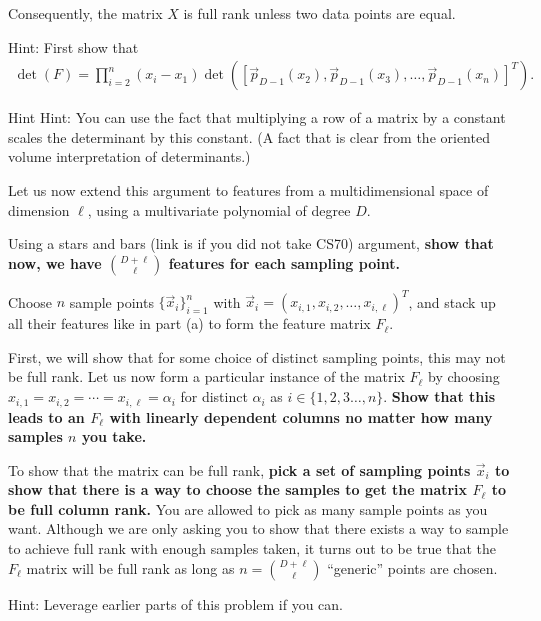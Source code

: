 \begin{Parts}
 Consequently, the matrix $X$ is full rank unless two data points are equal.

Hint: First show that
\begin{align*}
\det(F) = \prod_{i = 2}^n (x_i - x_1) \det( [\vec{p}_{D-1}(x_2),\vec{p}_{D-1}(x_3),\ldots,\vec{p}_{D-1}(x_n)]^T) .
\end{align*}

Hint Hint: You can use the fact that multiplying a row of a matrix by a constant scales the determinant by this constant. (A fact that is clear from the oriented volume interpretation of determinants.)


\Part Let us now extend this argument to features from a multidimensional space of dimension $\ell$, using a multivariate polynomial of degree $D$.

\newcommand{\MYhref}[3][blue]{\href{#2}{\color{#1}{#3}}}

Using a stars and bars (link is \href{https://inst.eecs.berkeley.edu/~cs70/fa15/slides/lec-18.6up.pdf}{\color{brown}{here}} if you did not take CS70) argument, {\bf show that now, we have $\binom{D + \ell}{\ell}$ features for each sampling point.}

\Part Choose $n$ sample points $\{\vec{x}_i\}_{i=1}^n$ with $\vec{x}_i = (x_{i,1}, x_{i,2}, \ldots , x_{i,\ell})^T$, and stack up all their features like in part (a) to form the feature matrix $F_{\ell}$. 

First, we will show that for some choice of distinct sampling points, this may not be full rank. Let us now form a particular instance of the matrix $F_{\ell}$ by choosing $x_{i,1} = x_{i,2} = \cdots  = x_{i,\ell} = \alpha_i$ for distinct $\alpha_i$ as $i \in \{1, 2, 3 \ldots, n\}$. {\bf Show that this leads to an $F_{\ell}$ with linearly dependent columns no matter how many samples $n$ you take.}

\Part To show that the matrix can be full rank, {\bf pick a set of sampling points $\vec{x}_i$ to show that there is a way to choose the samples to get the matrix $F_{\ell}$ to be full column rank.} You are allowed to pick as many sample points as you want. Although we are only asking you to show that there exists a way to sample to achieve full rank with enough samples taken, it turns out to be true that the $F_{\ell}$ matrix will be full rank as long as $n=\binom{D + \ell}{\ell}$ ``generic'' points are chosen. 

Hint: Leverage earlier parts of this problem if you can. 

\end{Parts}

